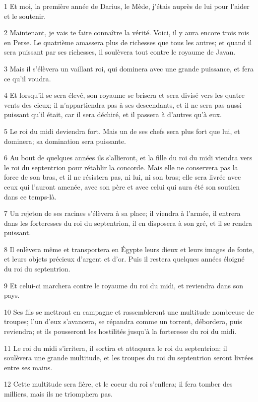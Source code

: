 \par 1 Et moi, la première année de Darius, le Mède, j'étais auprès de lui pour l'aider et le soutenir.
\par 2 Maintenant, je vais te faire connaître la vérité. Voici, il y aura encore trois rois en Perse. Le quatrième amassera plus de richesses que tous les autres; et quand il sera puissant par ses richesses, il soulèvera tout contre le royaume de Javan.
\par 3 Mais il s'élèvera un vaillant roi, qui dominera avec une grande puissance, et fera ce qu'il voudra.
\par 4 Et lorsqu'il se sera élevé, son royaume se brisera et sera divisé vers les quatre vents des cieux; il n'appartiendra pas à ses descendants, et il ne sera pas aussi puissant qu'il était, car il sera déchiré, et il passera à d'autres qu'à eux.
\par 5 Le roi du midi deviendra fort. Mais un de ses chefs sera plus fort que lui, et dominera; sa domination sera puissante.
\par 6 Au bout de quelques années ils s'allieront, et la fille du roi du midi viendra vers le roi du septentrion pour rétablir la concorde. Mais elle ne conservera pas la force de son bras, et il ne résistera pas, ni lui, ni son bras; elle sera livrée avec ceux qui l'auront amenée, avec son père et avec celui qui aura été son soutien dans ce temps-là.
\par 7 Un rejeton de ses racines s'élèvera à sa place; il viendra à l'armée, il entrera dans les forteresses du roi du septentrion, il en disposera à son gré, et il se rendra puissant.
\par 8 Il enlèvera même et transportera en Égypte leurs dieux et leurs images de fonte, et leurs objets précieux d'argent et d'or. Puis il restera quelques années éloigné du roi du septentrion.
\par 9 Et celui-ci marchera contre le royaume du roi du midi, et reviendra dans son pays.
\par 10 Ses fils se mettront en campagne et rassembleront une multitude nombreuse de troupes; l'un d'eux s'avancera, se répandra comme un torrent, débordera, puis reviendra; et ils pousseront les hostilités jusqu'à la forteresse du roi du midi.
\par 11 Le roi du midi s'irritera, il sortira et attaquera le roi du septentrion; il soulèvera une grande multitude, et les troupes du roi du septentrion seront livrées entre ses mains.
\par 12 Cette multitude sera fière, et le coeur du roi s'enflera; il fera tomber des milliers, mais ils ne triomphera pas.
